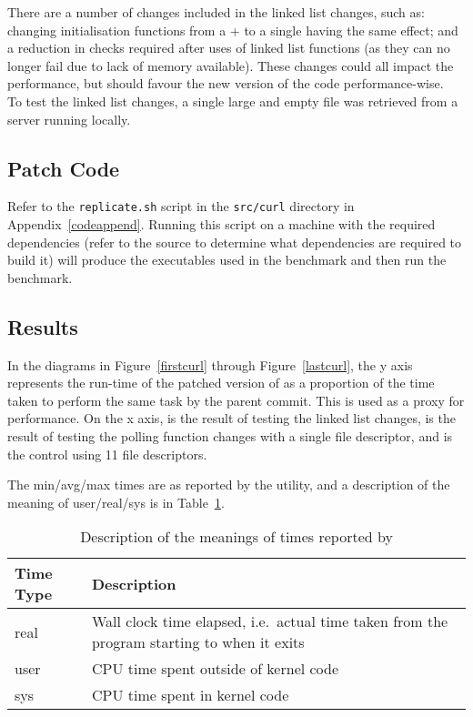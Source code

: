 There are a number of changes included in the linked list changes, such as: changing initialisation functions from a \malloc{}+ to a single  having the same effect; and a reduction in checks required after uses of linked list functions (as they can no longer fail due to lack of memory available). These changes could all impact the performance, but should favour the new version of the code performance-wise.\\
To test the linked list changes, a single large and empty file was retrieved from a server running locally.

\subsection{Patch Code}

Refer to the \texttt{replicate.sh} script in the \texttt{src/curl} directory in Appendix~\ref{codeappend}. Running this script on a machine with the required dependencies (refer to the  source to determine what dependencies are required to build it) will produce the executables used in the benchmark and then run the benchmark.

\subsection{Results}

In the diagrams in Figure~\ref{firstcurl} through Figure~\ref{lastcurl}, the y axis represents the run-time of the patched version of  as a proportion of the time taken to perform the same task by the parent commit. This is used as a proxy for performance. On the x axis,  is the result of testing the linked list changes,  is the result of testing the polling function changes with a single file descriptor, and  is the control using 11 file descriptors.

The min/avg/max times are as reported by the  utility, and a description of the meaning of user/real/sys is in Table~\ref{timestable}.

\begin{table}
	\centering
	\begin{tabularx}{\linewidth}{>{\hsize=0.6\hsize}X >{\hsize=1.4\hsize}X}
		\toprule
		\textbf{Time Type} & \textbf{Description} \\
		\midrule
		real & Wall clock time elapsed, i.e.\ actual time taken from the program starting to when it exits \\
		user & CPU time spent outside of kernel code \\
		sys & CPU time spent in kernel code \\
		\bottomrule
	\end{tabularx}
	\caption{Description of the meanings of times reported by }\label{timestable}
\end{table}

